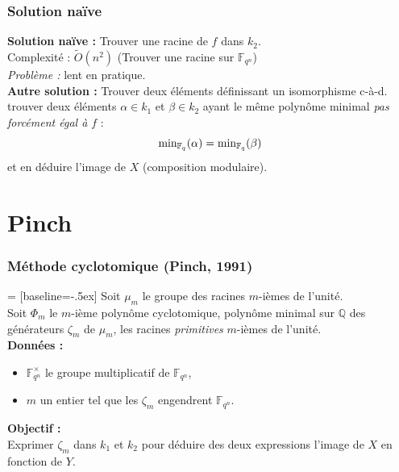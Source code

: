 \documentclass{beamer} %
\numberwithin{equation}{section}
\newcommand\GF[1]{\mathbb{F}_{#1}}
\newcommand\QQ{\mathbb{Q}}
\newcommand\tO[1]{\widetilde{O}(#1)}
\begin{document}
\begin{frame}
\frametitle{Solution naïve}
\textbf{Solution naïve :}
Trouver une racine de $f$ dans $k_2$.\\
Complexité : $\tO{n^2}$ (Trouver une racine sur $\GF{q^n}$)\\
\emph{Problème :} lent en pratique.\\
\vspace{0.3cm}
\textbf{Autre solution :}
Trouver deux éléments définissant un isomorphisme c-à-d. trouver deux éléments 
$\alpha\in k_1$ et $\beta\in k_2$ ayant le même polynôme minimal \emph{pas 
forcément égal à $f$} : 
\[\textup{min}_{\GF{q}}(\alpha) = \textup{min}_{\GF{q}}(\beta)\]
et en déduire l'image de $X$ (composition modulaire).\\
\end{frame}
\section{Pinch}
\begin{frame}
\frametitle{Méthode cyclotomique (Pinch, 1991)}
 = [baseline=-.5ex]
Soit $\mu_m$ le groupe des racines $m$-ièmes de l'unité.\\
Soit $\Phi_m$ le $m$-ième polynôme cyclotomique, polynôme minimal sur $\QQ$ des
générateurs $\zeta_m$ de $\mu_m$, les racines \emph{primitives} $m$-ièmes de 
l'unité.\\
\vspace{0.3cm}
\textbf{Données :}
\begin{itemize}
	\item $\GF{q^n}^{\times}$ le groupe multiplicatif de $\GF{q^n}$,
	\item $m$ un entier tel que les $\zeta_m$ engendrent $\GF{q^n}$.
\end{itemize}
\vspace{0.3cm}
\textbf{Objectif :}\\
Exprimer $\zeta_m$ dans $k_1$ et $k_2$ pour déduire des deux expressions l'image
de $X$ en fonction de $Y$.
\end{frame}
\end{document}
